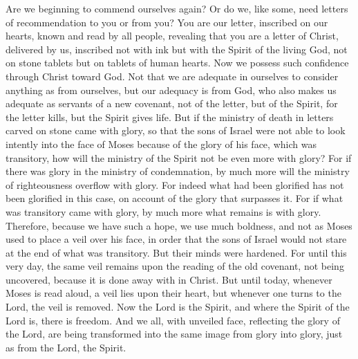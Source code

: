 \begin{biblechapter} %
 Are we beginning to commend ourselves again? Or do we, like some, need letters of recommendation to you or from you?
\verse You are our letter, inscribed on our hearts, known and read by all people,
\verse revealing that you are a letter of Christ, delivered by us, inscribed not with ink but with the Spirit of the living God, not on stone tablets but on tablets of human hearts.
\verse Now we possess such confidence through Christ toward God.
\verse Not that we are adequate in ourselves to consider anything as from ourselves, but our adequacy is from God,
\verse who also makes us adequate as servants of a new covenant, not of the letter, but of the Spirit, for the letter kills, but the Spirit gives life.
\verse But if the ministry of death in letters carved on stone came with glory, so that the sons of Israel were not able to look intently into the face of Moses because of the glory of his face, which was transitory,
\verse how will the ministry of the Spirit not be even more with glory?
\verse For if there was glory in the ministry of condemnation, by much more will the ministry of righteousness overflow with glory.
\verse For indeed what had been glorified has not been glorified in this case, on account of the glory that surpasses it.
\verse For if what was transitory came with glory, by much more what remains is with glory.
\verse Therefore, because we have such a hope, we use much boldness,
\verse and not as Moses used to place a veil over his face, in order that the sons of Israel would not stare at the end of what was transitory.
\verse But their minds were hardened. For until this very day, the same veil remains upon the reading of the old covenant, not being uncovered, because it is done away with in Christ.
\verse But until today, whenever Moses is read aloud, a veil lies upon their heart,
\verse but whenever one turns to the Lord, the veil is removed.
\verse Now the Lord is the Spirit, and where the Spirit of the Lord is, there is freedom.
\verse And we all, with unveiled face, reflecting the glory of the Lord, are being transformed into the same image from glory into glory, just as from the Lord, the Spirit.
\end{biblechapter}

